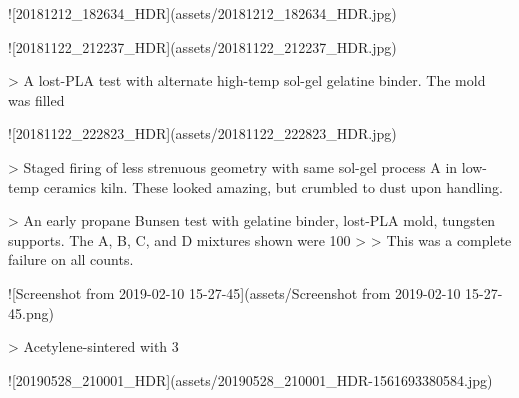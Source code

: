 \documentclass[fleqn,10pt]{article}
\begin{document}
![20181212_182634_HDR](assets/20181212_182634_HDR.jpg)



![20181122_212237_HDR](assets/20181122_212237_HDR.jpg)

> A lost-PLA test with alternate high-temp sol-gel gelatine binder. The mold was filled 





![20181122_222823_HDR](assets/20181122_222823_HDR.jpg)

> Staged firing of less strenuous geometry with same sol-gel process A in low-temp ceramics kiln. These looked amazing, but crumbled to dust upon handling.





> An early propane Bunsen test with gelatine binder, lost-PLA mold, tungsten supports. The A, B, C, and D mixtures shown were 100%
>
> This was a complete failure on all counts.

![Screenshot from 2019-02-10 15-27-45](assets/Screenshot from 2019-02-10 15-27-45.png)

> Acetylene-sintered with 3%



![20190528_210001_HDR](assets/20190528_210001_HDR-1561693380584.jpg)
\end{document}
